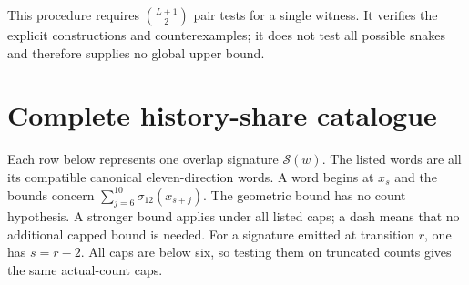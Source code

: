 \documentclass[11pt,a4paper]{article}
\theoremstyle{definition}
\theoremstyle{remark}
\begin{document}
This procedure requires $\binom{L+1}{2}$ pair tests for a single witness. It verifies the explicit constructions and counterexamples; it does not test all possible snakes and therefore supplies no global upper bound.

\section{Complete history-share catalogue}\label{app:history-share-table}
Each row below represents one overlap signature $\mathcal S(w)$. The listed
words are all its compatible canonical eleven-direction words. A word begins
at $x_s$ and the bounds concern $\sum_{j=6}^{10}\sigma_{12}(x_{s+j})$.
The geometric bound has no count hypothesis. A stronger bound applies under
all listed caps; a dash means that no additional capped bound is needed.
For a signature emitted at transition $r$, one has $s=r-2$. All caps are below
six, so testing them on truncated counts gives the same actual-count caps.
\end{document}
